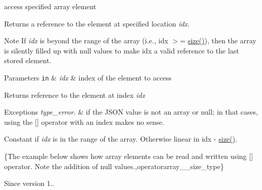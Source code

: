 access specified array element 

Returns a reference to the element at specified location {\itshape idx}.

\begin{DoxyNote}{Note}
If {\itshape idx} is beyond the range of the array (i.\+e., {\ttfamily idx $>$= \hyperlink{classnlohmann_1_1basic__json_a33c7c8638bb0b12e6d1b69d8106dd2e0}{size()}}), then the array is silently filled up with {\ttfamily null} values to make {\ttfamily idx} a valid reference to the last stored element.
\end{DoxyNote}

\begin{DoxyParams}[1]{Parameters}
\mbox{\tt in}  & {\em idx} & index of the element to access\\
\hline
\end{DoxyParams}
\begin{DoxyReturn}{Returns}
reference to the element at index {\itshape idx} 
\end{DoxyReturn}

\begin{DoxyExceptions}{Exceptions}
{\em type\+\_\+error.} & if the J\+S\+ON value is not an array or null; in that cases, using the \mbox{[}\mbox{]} operator with an index makes no sense.\\
\hline
\end{DoxyExceptions}
Constant if {\itshape idx} is in the range of the array. Otherwise linear in {\ttfamily idx -\/ \hyperlink{classnlohmann_1_1basic__json_a33c7c8638bb0b12e6d1b69d8106dd2e0}{size()}}.

\{The example below shows how array elements can be read and written using {\ttfamily \mbox{[}\mbox{]}} operator. Note the addition of {\ttfamily null} values.,operatorarray\+\_\+\+\_\+size\+\_\+type\}

\begin{DoxySince}{Since}
version 1.. 
\end{DoxySince}
